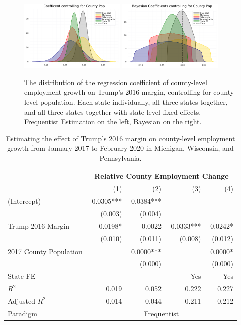 \documentclass[11pt]{article}
\begin{document}
\begin{figure}
    \centering
    \includegraphics[width=0.45\textwidth]{plots/population-coefs.png}
    \hfill
    \includegraphics[width=0.45\textwidth]{plots/bayesian-pop-coefs.png}
    \caption{The distribution of the regression coefficient of county-level employment growth on Trump's 2016 margin, controlling for county-level population. Each state individually, all three states together, and all three states together with state-level fixed effects. Frequentist Estimation on the left, Bayesian on the right.}
\end{figure}
\begin{table}
    \centering
    \begin{tabular}{l|rrrr}
\toprule
                    &       \multicolumn{4}{c}{Relative County Employment Change}      \\ 
                    \hline
                    &        (1) &        (2) &        (3) &      (4) \\ 
(Intercept)         & -0.0305*** & -0.0384*** &            &          \\ 
                    &    (0.003) &    (0.004) &            &          \\ 
Trump 2016 Margin              &   -0.0198* &    -0.0022 & -0.0333*** & -0.0242* \\ 
                    &    (0.010) &    (0.011) &    (0.008) &  (0.012) \\ 
2017 County Population           &            &  0.0000*** &            &  0.0000* \\ 
                    &            &    (0.000) &            &  (0.000) \\ 
\hline
State FE &            &            &        Yes &      Yes \\ 
\hline
$R^2$               &      0.019 &      0.052 &      0.222 &    0.227 \\ 
Adjusted $R^2$      &      0.014 &      0.044 &      0.211 &    0.212 \\ 
\hline
Paradigm & \multicolumn{4}{c}{Frequentist} \\
\end{tabular}
\caption{Estimating the effect of Trump's 2016 margin on county-level employment growth from January 2017 to February 2020 in Michigan, Wisconsin, and Pennsylvania.}
\label{tab:freq}
\end{table}
\end{document}
